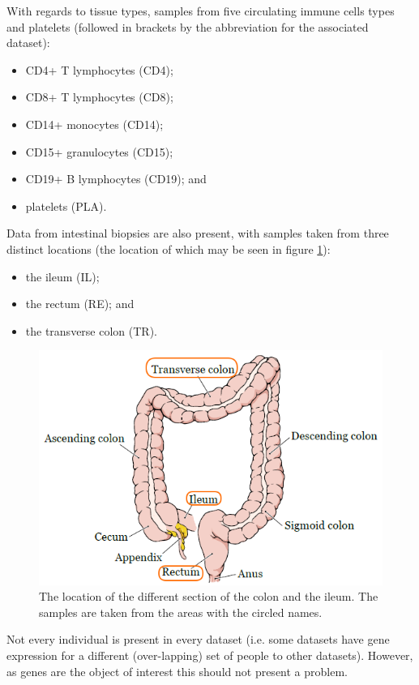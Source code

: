 \documentclass[12pt]{article} %
\begin{document}
	With regards to tissue types, samples from five circulating immune cells types and platelets (followed in brackets by the abbreviation for the associated dataset):
	\begin{itemize}
		\item CD4+ T lymphocytes (CD4);
		\item CD8+ T lymphocytes (CD8);
		\item CD14+ monocytes (CD14);
		\item CD15+ granulocytes (CD15);
		\item CD19+ B lymphocytes (CD19); and 
		\item platelets (PLA).
	\end{itemize}
	Data from intestinal biopsies are also present, with samples taken from three distinct locations (the location of which may be seen in figure \ref{fig:colon_location}):
	\begin{itemize}
		\item the ileum (IL);
		\item the rectum (RE); and
		\item the transverse colon (TR).
	\end{itemize} 

	\begin{figure}[h]
		\centering
		\includegraphics[scale=0.55]{Images/colon_highlight.png}
		\caption{The location of the different section of the colon and the ileum. The samples are taken from the areas with the circled names.}
		\label{fig:colon_location}
	\end{figure}
	

	Not every individual is present in every dataset (i.e. some datasets have gene expression for a different (over-lapping) set of people to other datasets). However, as genes are the object of interest this should not present a problem.
	
\end{document}
